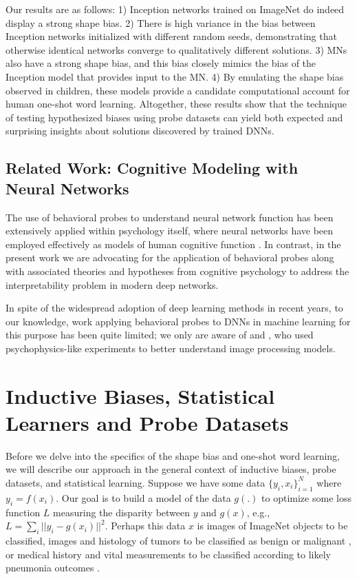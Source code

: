 \documentclass{article}
\begin{document}
Our results are as follows: 1) Inception networks trained on ImageNet do indeed display a strong shape bias. 2) There is high variance in the bias between Inception networks initialized with different random seeds, demonstrating that otherwise identical networks converge to qualitatively different solutions. 3) MNs also have a strong shape bias, and this bias closely mimics the bias of the Inception model that provides input to the MN. 4) By emulating the shape bias observed in children, these models provide a candidate computational account for human one-shot word learning. Altogether, these results show that the technique of testing hypothesized biases using probe datasets can yield both expected and surprising insights about solutions discovered by trained DNNs.

\subsection{Related Work: Cognitive Modeling with Neural Networks}

The use of behavioral probes to understand neural network function has been extensively applied within psychology itself, where neural networks have been employed effectively as models of human cognitive function \citep{rumelhart1988parallel,plaut1996understanding,rogers2004semantic,mareschal2000connectionist}. In contrast, in the present work we are advocating for the application of behavioral probes along with associated theories and hypotheses from cognitive psychology to address the interpretability problem in modern deep networks. 

In spite of the widespread adoption of deep learning methods in recent years, to our knowledge, work applying behavioral probes to DNNs in machine learning for this purpose has been quite limited; we only are aware of \citet{zoran2015learning} and \citet{goodfellow2009measuring}, who used psychophysics-like experiments to better understand image processing models.
\section{Inductive Biases, Statistical Learners and Probe Datasets}

Before we delve into the specifics of the shape bias and one-shot word learning, we will describe our approach in the general context of inductive biases, probe datasets, and statistical learning. Suppose we have some data $\{y_i, x_i \}_{i=1}^N$ where $y_i=f(x_i)$. Our goal is to build a model of the data $g(.)$ to optimize some loss function $L$ measuring the disparity between $y$ and $g(x)$, e.g., $L=\sum_i ||y_i - g(x_i)||^2$. Perhaps this data $x$ is images of ImageNet objects to be classified, images and histology of tumors to be classified as benign or malignant \citep{kourou2015machine}, or medical history and vital measurements to be classified according to likely pneumonia outcomes \citep{caruana2015intelligible}. 
\end{document}
